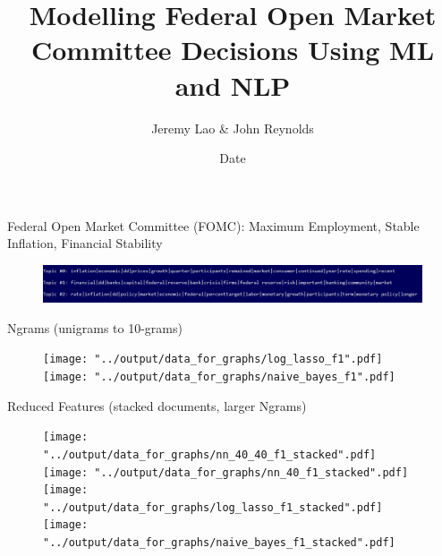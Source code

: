 \documentclass{beamer}
\title{Modelling Federal Open Market Committee Decisions Using ML and NLP}
\author{Jeremy Lao \& John Reynolds}
\institute[NYU]
{
Department of Computer Science\\
Courant Institute of Mathematical Sciences, NYU\\
  \texttt{}
}
\date{Date}
\begin{document}
\begin{frame}
\titlepage
\end{frame}



\begin{frame}
Federal Open Market Committee (FOMC): Maximum Employment, Stable Inflation, Financial Stability
\begin{figure}[H]
\includegraphics[width=1\textwidth]{../output/data_for_graphs/Topic-Model-3-topics.PNG}
\end{figure}
\vspace{-5mm}

Ngrams (unigrams to 10-grams)
\vspace{-1mm}
\begin{figure}[H]
\begin{center}
\texttt{[image: "../output/data\_for\_graphs/log\_lasso\_f1".pdf]}
\texttt{[image: "../output/data\_for\_graphs/naive\_bayes\_f1".pdf]}
\end{center}
\end{figure}
\vspace{-5mm}

Reduced Features (stacked documents, larger Ngrams)
\vspace{-1mm}
\begin{figure}[H]
\texttt{[image: "../output/data\_for\_graphs/nn\_40\_40\_f1\_stacked".pdf]}
\texttt{[image: "../output/data\_for\_graphs/nn\_40\_f1\_stacked".pdf]}
\texttt{[image: "../output/data\_for\_graphs/log\_lasso\_f1\_stacked".pdf]}
\texttt{[image: "../output/data\_for\_graphs/naive\_bayes\_f1\_stacked".pdf]}
\end{figure}

\end{frame}
\end{document}
